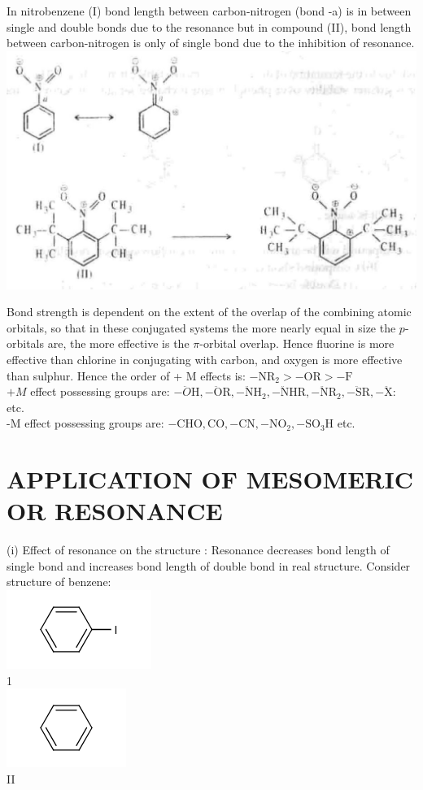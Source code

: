 \documentclass[10pt]{article}
\begin{document}
In nitrobenzene (I) bond length between carbon-nitrogen (bond -a) is in between single and double bonds due to the resonance but in compound (II), bond length between carbon-nitrogen is only of single bond due to the inhibition of resonance.\\
\includegraphics[max width=\textwidth, center]{2025_01_28_8470952b98110cec3aabg-073}

Bond strength is dependent on the extent of the overlap of the combining atomic orbitals, so that in these conjugated systems the more nearly equal in size the $p$-orbitals are, the more effective is the $\pi$-orbital overlap. Hence fluorine is more effective than chlorine in conjugating with carbon, and oxygen is more effective than sulphur. Hence the order of + M effects is: $-\mathrm{NR}_{2}>-\mathrm{OR}>-\mathrm{F}$\\
$+M$ effect possessing groups are: $-\ddot{O} \mathrm{H},-\ddot{\mathrm{O}} \mathrm{R},-\ddot{\mathrm{N}} \mathrm{H}_{2},-\ddot{\mathrm{N}} \mathrm{HR},-\ddot{\mathrm{N}} \mathrm{R}_{2},-\ddot{\mathrm{S}} \mathrm{R},-\ddot{\mathrm{X}}:$ etc.\\
-M effect possessing groups are: $-\mathrm{CHO}, \mathrm{CO},-\mathrm{CN},-\mathrm{NO}_{2},-\mathrm{SO}_{3} \mathrm{H}$ etc.

\section*{APPLICATION OF MESOMERIC OR RESONANCE}
(i) Effect of resonance on the structure : Resonance decreases bond length of single bond and increases bond length of double bond in real structure. Consider structure of benzene:\\
\includegraphics{smile-9871e9ae19195042e80206cf15f5132050530149}\\
1\\
\includegraphics{smile-357971878e566dc52102dd64c43e92405d711d65}\\
II
\end{document}
